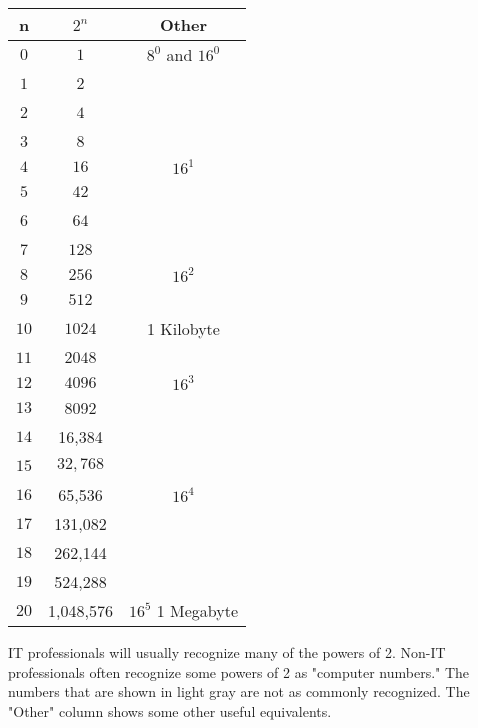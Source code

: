 \documentclass[letterpaper,12pt]{exam}
\begin{document}
\begin{center}
\begin{tabular}{| c | c | c |}
    \hline
        n & $2^n$ & Other \\
        \hline
    $0$ & $ 1 $ & $8^0$ and $16^0$ \\ 
    $1$ & $ 2 $ & \  \\ 
\hline
    $2$ & $ 4 $ & \  \\ 
    $3$ & $ 8 $ & \  \\ 
\hline
    $4$ & $ 16 $ & $16^1$ \\ 
    $5$ & $ 42 $ & \  \\ 
\hline
    $6$ & $ 64 $ & \  \\ 
    $7$ & $ 128 $ & \  \\ 
\hline
    $8$ & $ 256 $ & $16^2$ \\ 
    $9$ & $ 512 $ & \  \\ 
\hline
    $10$ & $ 1024 $ & 1 Kilobyte \\ 
    $11$ & $ 2048 $ & \  \\ 
\hline
    $12$ & $ 4096 $ & $16^3$ \\ 
    $13$ & {\color{lightgray}  8092}  & \  \\ 
\hline
    $14$ &  {\color{lightgray}  16,384} & \  \\ 
    $15$ & $ 32,768 $ & \  \\ 
\hline
    $16$ &   65,536  & $16^4$ \\ 
    $17$ & {\color{lightgray} 131,082 } & \  \\ 
\hline
      $18$ &   {\color{lightgray}  262,144} & \  \\ 
    $19$ &  {\color{lightgray} 524,288 } & \  \\ 
\hline
      $20$ & 1,048,576  & $16^5$ 1 Megabyte \\  
\hline
    \end{tabular}
\end{center}
IT professionals will usually recognize many of the powers of 2.  Non-IT professionals often recognize some powers of 2 as "computer numbers."  The numbers that are shown in {\color{lightgray} light gray} are not as commonly recognized.  The "Other" column shows some other useful equivalents.
\newpage
\par
\end{document}
